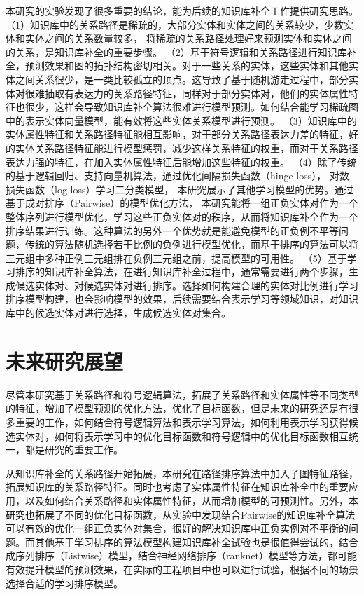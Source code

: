 本研究的实验发现了很多重要的结论，能为后续的知识库补全工作提供研究思路。
（1）知识库中的关系路径是稀疏的，大部分实体和实体之间的关系较少，少数实体和实体之间的关系数量较多，
将稀疏的关系路径处理好来预测实体和实体之间的关系，是知识库补全的重要步骤。
（2）基于符号逻辑和关系路径进行知识库补全，预测效果和图的拓扑结构密切相关。对于一些关系的实体，这些实体和其他实体之间关系很少，是一类比较孤立的顶点。这导致了基于随机游走过程中，部分实体对很难抽取有表达力的关系路径特征，同样对于部分实体对，他们的实体属性特征也很少，这样会导致知识库补全算法很难进行模型预测。如何结合能学习稀疏图中的表示实体向量模型，能有效将这些实体关系模型进行预测。
（3）知识库中的实体属性特征和关系路径特征能相互影响，对于部分关系路径表达力差的特征，好的实体关系路径特征能进行模型惩罚，减少这样关系特征的权重，而对于关系路径表达力强的特征，在加入实体属性特征后能增加这些特征的权重。
（4）除了传统的基于逻辑回归、支持向量机算法，通过优化间隔损失函数（hinge loss），
对数损失函数（log loss）学习二分类模型，
本研究展示了其他学习模型的优势。通过基于成对排序（Pairwise）的模型优化方法，
本研究能将一组正负实体对作为一个整体序列进行模型优化，学习这些正负实体对的秩序，从而将知识库补全作为一个排序结果进行训练。这种算法的另外一个优势就是能避免模型的正负例不平等问题，传统的算法随机选择若干比例的负例进行模型优化，而基于排序的算法可以将三元组中多种正例三元组排在负例三元组之前，提高模型的可用性。
（5）基于学习排序的知识库补全算法，在进行知识库补全过程中，通常需要进行两个步骤，生成候选实体对、对候选实体对进行排序。选择如何构建合理的实体对比例进行学习排序模型构建，也会影响模型的效果，后续需要结合表示学习等领域知识，对知识库中的候选实体对进行选择，生成候选实体对集合。

\section{未来研究展望}
尽管本研究基于关系路径和符号逻辑算法，拓展了关系路径和实体属性等不同类型的特征，增加了模型预测的优化方法，优化了目标函数，但是未来的研究还是有很多重要的工作，如何结合符号逻辑算法和表示学习算法，如何利用表示学习获得候选实体对，如何将表示学习中的优化目标函数和符号逻辑中的优化目标函数相互统一，都是研究的重要工作。

从知识库补全的关系路径开始拓展，本研究在路径排序算法中加入子图特征路径，拓展知识库的关系路径特征。同时也考虑了实体属性特征在知识库补全中的重要应用，以及如何结合关系路径和实体属性特征，从而增加模型的可预测性。另外，本研究也拓展了不同的优化目标函数，从实验中发现结合Pairwise的知识库补全算法可以有效的优化一组正负实体对集合，很好的解决知识库中正负实例对不平衡的问题。而其他基于学习排序的算法模型构建知识库补全试验也是很值得尝试的，结合成序列排序（Listwise）模型，结合神经网络排序（ranknet）模型等方法，都可能有效提升模型的预测效果，在实际的工程项目中也可以进行试验，根据不同的场景选择合适的学习排序模型。

